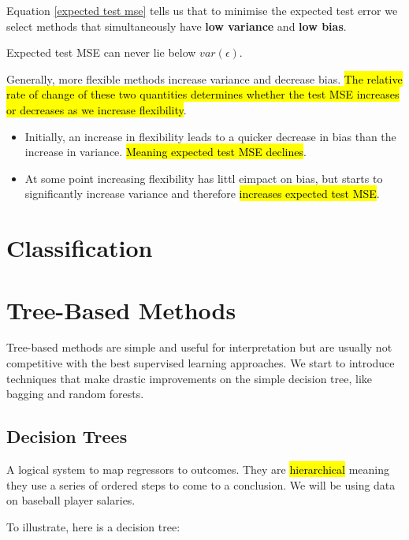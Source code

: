 \documentclass[11pt]{article}
\begin{document}
Equation \eqref{expected test mse} tells us that to minimise the expected test error we select methods that simultaneously have \textbf{low variance} and \textbf{low bias}.

\begin{note}
    Expected test MSE can never lie below $var(\epsilon)$.
\end{note}

Generally, more flexible methods increase variance and decrease bias. \hl{The relative rate of change of these two quantities determines whether the test MSE increases or decreases as we increase flexibility}.
\begin{itemize}
    \item Initially, an increase in flexibility leads to a quicker decrease in bias than the increase in variance. \hl{Meaning expected test MSE declines}.
    \item At some point increasing flexibility has littl eimpact on bias, but starts to significantly increase variance and therefore \hl{increases expected test MSE}.
\end{itemize}




\newpage
\section{Classification}

\newpage

\section{Tree-Based Methods}

Tree-based methods are simple and useful for interpretation but are usually not competitive with the best supervised learning approaches. We start to introduce techniques that make drastic improvements on the simple decision tree, like bagging and random forests.


\subsection{Decision Trees}

A logical system to map regressors to outcomes. They are \hl{hierarchical} meaning they use a series of ordered steps to come to a conclusion. We will be using data on baseball player salaries.

To illustrate, here is a decision tree:
\end{document}

